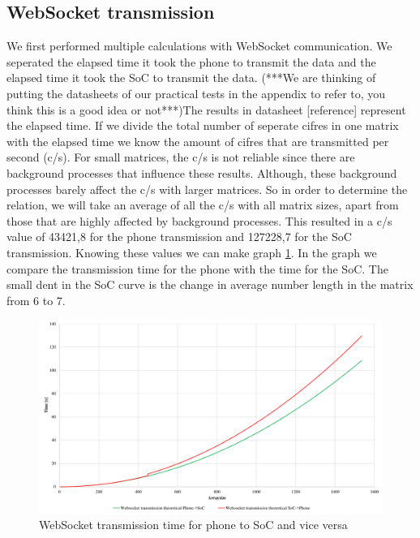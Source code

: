 \documentclass[a4paper, 11pt]{report}
\begin{document}
\subsection{WebSocket transmission}
We first performed multiple calculations with WebSocket communication. We seperated the elapsed time it took the phone to transmit the data and the elapsed time it took the SoC to transmit the data. (***We are thinking of putting the datasheets of our practical tests in the appendix to refer to, you think this is a good idea or not***)The results in datasheet [reference] represent the elapsed time. If we divide the total number of seperate cifres in one matrix with the elapsed time we know the amount of cifres that are transmitted per second (c/s). For small matrices, the c/s is not reliable since there are background processes that influence these results. Although, these background processes barely affect the c/s with larger matrices. So in order to determine the relation, we will take an average of all the c/s with all matrix sizes, apart from those that are highly affected by background processes. This resulted in a c/s value of 43421,8 for the phone transmission and 127228,7 for the SoC transmission. Knowing these values we can make graph \ref{graph:websocketTime}. In the graph we compare the transmission time for the phone with the time for the SoC. The small dent in 
the SoC curve is the change in average number length in the matrix from 6 to 7.
\begin{figure}[ht]
\centering
\includegraphics[scale=0.45]{images/WebsocketTransmissionSpeed.pdf}
\caption{WebSocket transmission time for phone to SoC and vice versa}\label{graph:websocketTime}
\end{figure}
\end{document}
